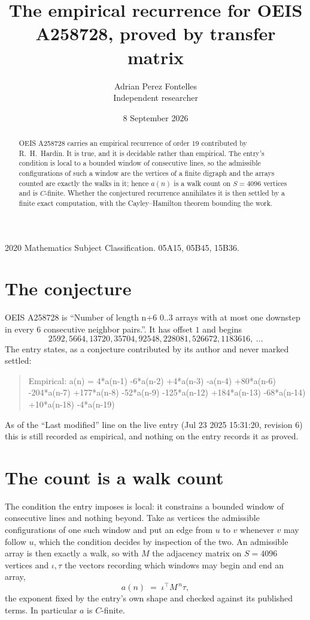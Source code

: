 \documentclass[11pt,a4paper]{article}
\title{The empirical recurrence for OEIS A258728, proved by transfer matrix}
\author{Adrian Perez Fontelles\\ \small Independent researcher}
\date{8 September 2026}
\theoremstyle{plain}
\theoremstyle{definition}
\begin{document}
\maketitle

\begin{abstract}
OEIS A258728 carries an empirical recurrence of order $19$ contributed by R.~H.~Hardin. It is
true, and it is decidable rather than empirical. The entry's condition is local to a bounded window of consecutive lines, so
the admissible configurations of such a window are the vertices of a finite digraph and the
arrays counted are exactly the walks in it; hence $a(n)$ is a walk count on $S=4096$ vertices
and is $C$-finite. Whether the conjectured recurrence annihilates it is then settled by a
finite exact computation, with the Cayley--Hamilton theorem bounding the work.
\end{abstract}

\noindent\small 2020 Mathematics Subject Classification. 05A15, 05B45, 15B36.\normalsize

\section{The conjecture}

OEIS A258728 is ``Number of length n+6 0..3 arrays with at most one downstep in every 6 consecutive neighbor pairs.''. It has offset $1$ and begins
\[
2592, 5664, 13720, 35704, 92548, 228081, 526672, 1183616,\ \dots
\]
The entry states, as a conjecture contributed by its author and never marked settled:
\begin{quote}
Empirical: a(n) = 4*a(n-1) -6*a(n-2) +4*a(n-3) -a(n-4) +80*a(n-6) -204*a(n-7) +177*a(n-8) -52*a(n-9) -125*a(n-12) +184*a(n-13) -68*a(n-14) +10*a(n-18) -4*a(n-19)
\end{quote}
As of the ``Last modified'' line on the live entry (Jul 23 2025 15:31:20, revision 6) this is still
recorded as empirical, and nothing on the entry records it as proved.

\section{The count is a walk count}

The condition the entry imposes is local: it constrains a bounded window of consecutive lines and nothing beyond. Take as
vertices the admissible configurations of one such window and put an edge from $u$ to $v$
whenever $v$ may follow $u$, which the condition decides by inspection of the two. An
admissible array is then exactly a walk, so with $M$ the adjacency matrix on $S=4096$ vertices
and $\iota,\tau$ the vectors recording which windows may begin and end an array,
\[
a(n)\;=\;\iota^{\!\top}M^{\,n}\tau ,
\]
the exponent fixed by the entry's own shape and checked against its published terms. In
particular $a$ is $C$-finite.
\end{document}
